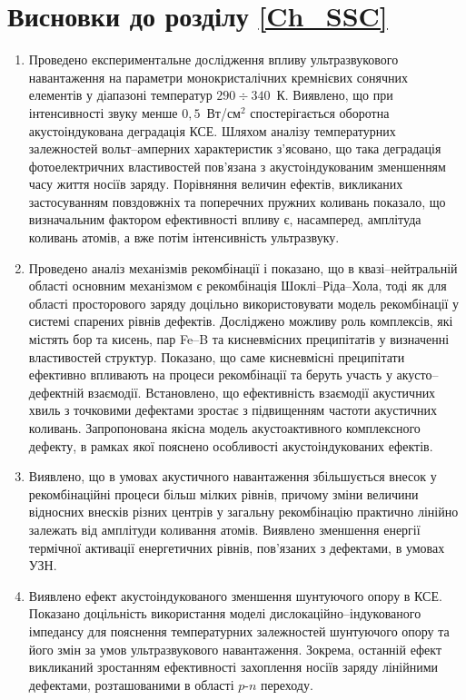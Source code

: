 \section*{Висновки до розділу \ref{Ch_SSC}}
  \begin{enumerate}[leftmargin=0cm,itemindent=3em]
     \item Проведено експериментальне дослідження впливу ультразвукового навантаження на параметри монокристалічних кремнієвих сонячних елементів
     у діапазоні температур $290\div340$~К.
     Виявлено, що при інтенсивності звуку менше $0,5$~Вт/см$^2$ спостерігається оборотна акустоіндукована деградація КСЕ.
     Шляхом аналізу температурних залежностей вольт--амперних характеристик з'ясовано, що така деградація фотоелектричних властивостей пов'язана з акустоіндукованим зменшенням часу життя носіїв заряду.
     Порівняння величин ефектів, викликаних застосуванням повздовжніх та поперечних пружних коливань показало, що визначальним фактором ефективності впливу є, насамперед, амплітуда коливань атомів, а вже потім інтенсивність ультразвуку.


     \item Проведено аналіз механізмів рекомбінації і показано, що в квазі--нейтральній області основним механізмом є рекомбінація Шоклі--Ріда--Хола,
     тоді як для області просторового заряду доцільно використовувати модель рекомбінації у системі спарених рівнів дефектів.
     Досліджено можливу роль комплексів, які містять бор та кисень, пар Fe--B та кисневмісних преципітатів у визначенні властивостей структур.
Показано, що саме кисневмісні преципітати ефективно впливають на процеси рекомбінації та беруть участь у акусто--дефектній взаємодії.
     Встановлено, що ефективність взаємодії акустичних хвиль з точковими дефектами зростає з підвищенням частоти акустичних коливань.
Запропонована якісна модель акустоактивного комплексного дефекту, в рамках якої пояснено особливості акустоіндукованих ефектів.


     \item Виявлено, що в умовах акустичного навантаження збільшується внесок у рекомбінаційні процеси більш мілких рівнів, причому зміни величини відносних внесків різних центрів у загальну рекомбінацію практично лінійно залежать від амплітуди коливання атомів.
         Виявлено зменшення енергії термічної активації енергетичних рівнів, пов'язаних з дефектами, в умовах УЗН.

     \item Виявлено ефект акустоіндукованого зменшення шунтуючого опору в КСЕ.
      Показано доцільність використання моделі дислокаційно--індукованого імпедансу для пояснення температурних залежностей шунтуючого опору та його змін за умов ультразвукового навантаження.
      Зокрема, останній ефект викликаний зростанням ефективності захоплення носіїв заряду лінійними дефектами,
      розташованими в області $p$-$n$ переходу.




\end{enumerate}
